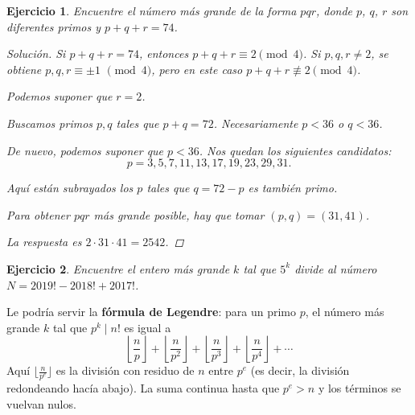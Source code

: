 \documentclass{article}
\theoremstyle{plain}
\newtheorem{ejercicio}{Ejercicio}
\newenvironment{solucion}{\begin{proof}[Solución]}{\end{proof}}
\begin{document}
\begin{ejercicio}
Encuentre el número más grande de la forma $pqr$, donde
$p$, $q$, $r$ son diferentes primos y $p + q + r = 74$.

\ifdefined\solutions
\begin{solucion}
    Si $p + q + r = 74$, entonces
    $p + q + r \equiv 2 \pmod{4}$.
    Si $p, q, r \ne 2$, se obtiene $p,q,r \equiv \pm 1$ $\pmod{4}$,
    pero en este caso $p + q + r \not\equiv 2 \pmod{4}$.

    Podemos suponer que $r = 2$.

    Buscamos primos $p, q$ tales que $p + q = 72$.
    Necesariamente $p < 36$ o $q < 36$.

    De nuevo, podemos suponer que $p < 36$. Nos quedan los siguientes candidatos:
    \[ p = 3, \boxed{5}, 7, \boxed{11}, \boxed{13}, 17, \boxed{19}, 23, \boxed{29}, \boxed{31}. \]

    Aquí están subrayados los $p$ tales que $q = 72 - p$ es también primo.

    Para obtener $pqr$ más grande posible, hay que tomar $(p,q) = (31,41)$.

    La respuesta es $2\cdot 31\cdot 41 = 2542$.
\end{solucion}
\fi
\end{ejercicio}

\pagebreak

\begin{ejercicio}
Encuentre el entero más grande $k$ tal que $5^k$ divide al número
$N = 2019! - 2018! + 2017!$.
\end{ejercicio}

Le podría servir la \textbf{fórmula de Legendre}: para un primo $p$,
el número más grande $k$ tal que $p^k \mid n!$ es igual a
\[
    \left\lfloor\frac{n}{p}\right\rfloor +
    \left\lfloor\frac{n}{p^2}\right\rfloor +
    \left\lfloor\frac{n}{p^3}\right\rfloor +
    \left\lfloor\frac{n}{p^4}\right\rfloor +
    \cdots
\]
Aquí $\lfloor\frac{n}{p^e}\rfloor$ es la división con residuo de $n$ entre $p^e$
(es decir, la división redondeando hacía abajo). La suma continua hasta que
$p^e > n$ y los términos se vuelvan nulos.
\end{document}
